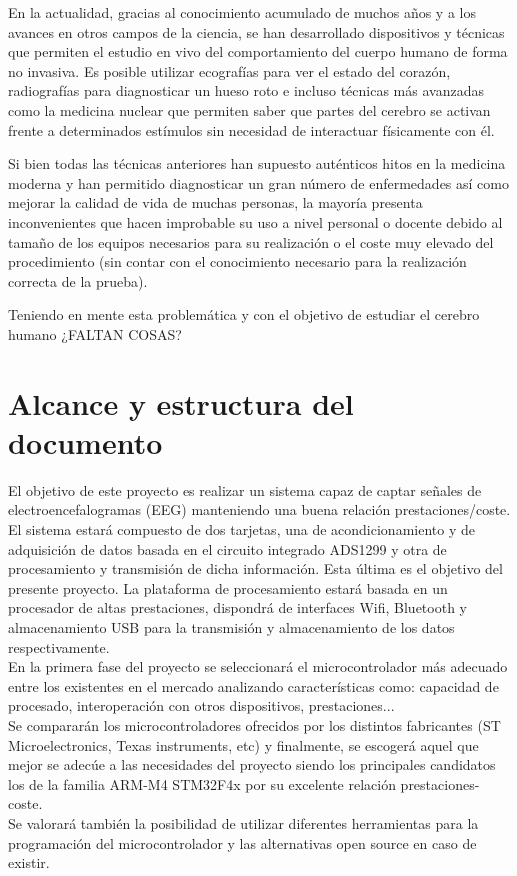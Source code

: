 En la actualidad, gracias al conocimiento acumulado de muchos años y a los avances en otros campos de la ciencia, se han desarrollado dispositivos y técnicas que permiten el estudio en vivo del comportamiento del cuerpo humano de forma no invasiva. Es posible utilizar ecografías para ver el estado del corazón, radiografías para diagnosticar un hueso roto e incluso técnicas más avanzadas como la medicina nuclear que permiten saber que partes del cerebro se activan frente a determinados estímulos sin necesidad de interactuar físicamente con él.

Si bien todas las técnicas anteriores han supuesto auténticos hitos en la medicina moderna y han permitido diagnosticar un gran número de enfermedades así como mejorar la calidad de vida de muchas personas, la mayoría presenta inconvenientes que hacen improbable su uso a nivel personal o docente debido al tamaño de los equipos necesarios para su realización o el coste muy elevado del procedimiento (sin contar con el conocimiento necesario para la realización correcta de la prueba).

Teniendo en mente esta problemática y con el objetivo de estudiar el cerebro humano ¿FALTAN COSAS?

\section{Alcance y estructura del documento}
El objetivo de este proyecto es realizar un sistema capaz de captar señales de electroencefalogramas (EEG) manteniendo una buena relación prestaciones/coste. El sistema estará compuesto de dos tarjetas, una de acondicionamiento y de adquisición de datos basada en el circuito integrado ADS1299 y otra de procesamiento y transmisión de dicha información. Esta última es el objetivo del presente proyecto. La plataforma de procesamiento estará basada en un procesador de altas prestaciones, dispondrá de interfaces Wifi, Bluetooth y almacenamiento USB para la transmisión y almacenamiento de los datos respectivamente. 
\\En la primera fase del proyecto se seleccionará el microcontrolador más adecuado entre los existentes en el mercado analizando características como: capacidad de procesado, interoperación con otros dispositivos, prestaciones...
\\Se compararán los microcontroladores ofrecidos por los distintos fabricantes (ST Microelectronics, Texas instruments, etc) y finalmente, se escogerá aquel que mejor se adecúe a las necesidades del proyecto siendo los principales candidatos los de la familia ARM-M4 STM32F4x por su excelente relación prestaciones-coste.
\\Se valorará también la posibilidad de utilizar diferentes herramientas para la programación del microcontrolador y las alternativas open source en caso de existir.

